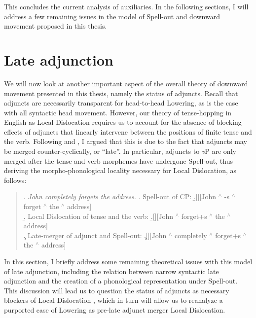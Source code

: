 This concludes the current analysis of auxiliaries. In the following sections, I will address a few remaining issues in the model of Spell-out and downward movement proposed in this thesis.

\section{Late adjunction}
We will now look at another important aspect of the overall theory of downward movement presented in this thesis, namely the status of adjuncts. Recall that adjuncts are necessarily transparent for head-to-head Lowering, as is the case with all syntactic head movement. However, our theory of tense-hopping in English as Local Dislocation requires us to account for the absence of blocking effects of adjuncts that linearly intervene between the positions of finite tense and the verb. Following \citet{lebeaux1988} and \citet{ochi1999}, I argued that this is due to the fact that adjuncts may be merged counter-cyclically, or ``late''. In particular, adjuncts to {\it v}P are only merged after the tense and verb morphemes have undergone Spell-out, thus deriving the morpho-phonological locality necessary for Local Dislocation, as follows:

\singlespacing
\begin{quote}
\begin{samepage}
\ex. \textit{John completely forgets the address.}
\a. Spell-out of CP:
\b.[][John $^{\wedge}$ -s $^{\wedge}$ forget $^{\wedge}$ the $^{\wedge}$ address]\\
\b. Local Dislocation of tense and the verb:
\b.[][John $^{\wedge}$ forget+s $^{\wedge}$ the $^{\wedge}$ address]\\
\c. Late-merger of adjunct and Spell-out:
\c.[][John $^{\wedge}$ completely $^{\wedge}$ forget+s $^{\wedge}$ the $^{\wedge}$ address]

\end{samepage}
\end{quote}
\onehalfspacing
In this section, I briefly address some remaining theoretical issues with this model of late adjunction, including the relation between narrow syntactic late adjunction and the creation of a phonological representation under Spell-out. This discussion will lead us to question the status of adjuncts as necessary blockers of Local Dislocation \citep{embick_noyer2001}, which in turn will allow us to reanalyze a purported case of Lowering as pre-late adjunct merger Local Dislocation.

